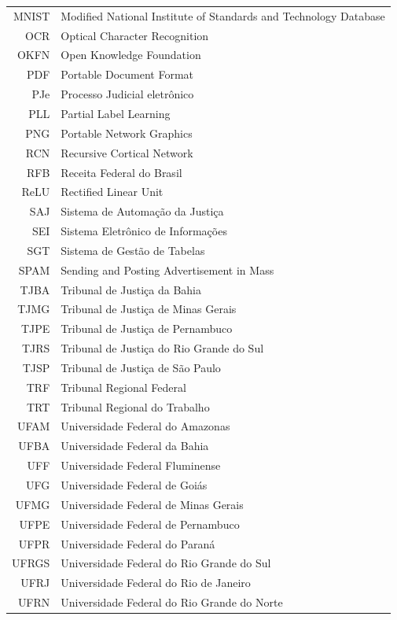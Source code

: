 \documentclass[12pt,twoside,brazilian]{book}
\begin{document}
\begin{tabular}{rl}
   MNIST & Modified National Institute of Standards and Technology Database\\
   OCR & Optical Character Recognition\\
   OKFN & Open Knowledge Foundation\\
   PDF & Portable Document Format\\
   PJe & Processo Judicial eletrônico\\
   PLL & Partial Label Learning\\
   PNG & Portable Network Graphics\\
   RCN & Recursive Cortical Network\\
   RFB & Receita Federal do Brasil\\
   ReLU & Rectified Linear Unit\\
   SAJ & Sistema de Automação da Justiça\\
   SEI & Sistema Eletrônico de Informações\\
   SGT & Sistema de Gestão de Tabelas\\
   SPAM & Sending and Posting Advertisement in Mass\\
   TJBA & Tribunal de Justiça da Bahia\\
   TJMG & Tribunal de Justiça de Minas Gerais\\
   TJPE & Tribunal de Justiça de Pernambuco\\
   TJRS & Tribunal de Justiça do Rio Grande do Sul\\
   TJSP & Tribunal de Justiça de São Paulo\\
   TRF & Tribunal Regional Federal\\
   TRT & Tribunal Regional do Trabalho\\
   UFAM & Universidade Federal do Amazonas\\
   UFBA & Universidade Federal da Bahia\\
   UFF & Universidade Federal Fluminense\\
   UFG & Universidade Federal de Goiás\\
   UFMG & Universidade Federal de Minas Gerais\\
   UFPE & Universidade Federal de Pernambuco\\
   UFPR & Universidade Federal do Paraná\\
   UFRGS & Universidade Federal do Rio Grande do Sul\\
   UFRJ & Universidade Federal do Rio de Janeiro\\
   UFRN & Universidade Federal do Rio Grande do Norte\\

\end{tabular}
\end{document}
